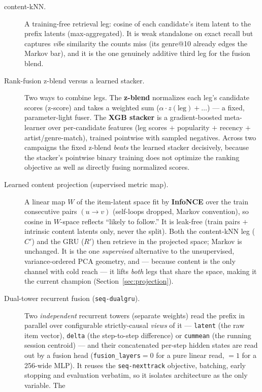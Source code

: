 \documentclass[11pt]{article}
\newcommand{\Rp}{\ensuremath{R'}}
\newcommand{\Cp}{\ensuremath{C'}}
\begin{document}
\begin{description}
  \item[content-kNN.] A training-free retrieval leg: cosine of each candidate's
  item latent to the prefix latents (max-aggregated). It is weak standalone on
  exact recall but captures \emph{vibe} similarity the counts miss (its genre@10
  already edges the Markov bar), and it is the one genuinely additive third leg
  for the fusion blend.
  \item[Rank-fusion z-blend versus a learned stacker.] Two ways to combine legs.
  The \textbf{z-blend} normalizes each leg's candidate scores (z-score) and takes
  a weighted sum ($\alpha\cdot z(\text{leg})+\dots$) --- a fixed, parameter-light
  fuser. The \textbf{XGB stacker} is a gradient-boosted meta-learner over
  per-candidate features (leg scores $+$ popularity $+$ recency $+$
  artist/genre-match), trained pointwise with sampled negatives. Across two
  campaigns the fixed z-blend \emph{beats} the learned stacker decisively,
  because the stacker's pointwise binary training does not optimize the ranking
  objective as well as directly fusing normalized scores.
  \item[Learned content projection (supervised metric map).] A linear map $W$ of
  the item-latent space fit by \textbf{InfoNCE} over the train consecutive pairs
  $(u\!\to\!v)$ (self-loops dropped, Markov convention), so cosine in $W$-space
  reflects ``likely to follow.'' It is leak-free (train pairs $+$ intrinsic
  content latents only, never the split). Both the content-kNN leg (\Cp) and the
  GRU (\Rp) then retrieve in the projected space; Markov is unchanged. It is the
  one \emph{supervised} alternative to the unsupervised, variance-ordered PCA
  geometry, and --- because content is the only channel with cold reach --- it
  lifts \emph{both} legs that share the space, making it the current champion
  (Section~\ref{sec:projection}).
  \item[Dual-tower recurrent fusion (\texttt{seq-dualgru}).] Two
  \emph{independent} recurrent towers (separate weights) read the prefix in
  parallel over configurable strictly-causal \emph{views} of it ---
  \texttt{latent} (the raw item vector), \texttt{delta} (the step-to-step
  difference) or \texttt{cummean} (the running session centroid) --- and their
  concatenated per-step hidden states are read out by a fusion head
  (\texttt{fusion\_layers}${}=0$ for a pure linear read, ${}=1$ for a 256-wide
  MLP). It reuses the \texttt{seq-nexttrack} objective, batching, early stopping
  and evaluation verbatim, so it isolates architecture as the only variable. The

\end{description}
\end{document}
